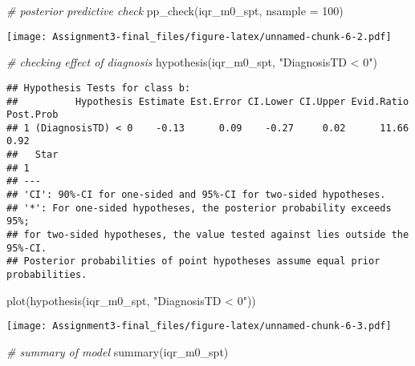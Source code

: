 \documentclass[
]{article}
\newenvironment{Shaded}{\begin{snugshade}}{\end{snugshade}}
\newcommand{\AttributeTok}[1]{\textcolor[rgb]{0.77,0.63,0.00}{#1}}
\newcommand{\CommentTok}[1]{\textcolor[rgb]{0.56,0.35,0.01}{\textit{#1}}}
\newcommand{\DecValTok}[1]{\textcolor[rgb]{0.00,0.00,0.81}{#1}}
\newcommand{\FunctionTok}[1]{\textcolor[rgb]{0.00,0.00,0.00}{#1}}
\newcommand{\NormalTok}[1]{#1}
\newcommand{\StringTok}[1]{\textcolor[rgb]{0.31,0.60,0.02}{#1}}
\begin{document}
\begin{Shaded}
\begin{Highlighting}[]
\CommentTok{\# posterior predictive check}
\FunctionTok{pp\_check}\NormalTok{(iqr\_m0\_spt, }\AttributeTok{nsample =} \DecValTok{100}\NormalTok{)}
\end{Highlighting}
\end{Shaded}

\texttt{[image: Assignment3-final\_files/figure-latex/unnamed-chunk-6-2.pdf]}

\begin{Shaded}
\begin{Highlighting}[]
\CommentTok{\# checking effect of diagnosis}
\FunctionTok{hypothesis}\NormalTok{(iqr\_m0\_spt, }\StringTok{"DiagnosisTD \textless{} 0"}\NormalTok{)}
\end{Highlighting}
\end{Shaded}

\begin{verbatim}
## Hypothesis Tests for class b:
##          Hypothesis Estimate Est.Error CI.Lower CI.Upper Evid.Ratio Post.Prob
## 1 (DiagnosisTD) < 0    -0.13      0.09    -0.27     0.02      11.66      0.92
##   Star
## 1     
## ---
## 'CI': 90%-CI for one-sided and 95%-CI for two-sided hypotheses.
## '*': For one-sided hypotheses, the posterior probability exceeds 95%;
## for two-sided hypotheses, the value tested against lies outside the 95%-CI.
## Posterior probabilities of point hypotheses assume equal prior probabilities.
\end{verbatim}

\begin{Shaded}
\begin{Highlighting}[]
\FunctionTok{plot}\NormalTok{(}\FunctionTok{hypothesis}\NormalTok{(iqr\_m0\_spt, }\StringTok{"DiagnosisTD \textless{} 0"}\NormalTok{))}
\end{Highlighting}
\end{Shaded}

\texttt{[image: Assignment3-final\_files/figure-latex/unnamed-chunk-6-3.pdf]}

\begin{Shaded}
\begin{Highlighting}[]
\CommentTok{\# summary of model}
\FunctionTok{summary}\NormalTok{(iqr\_m0\_spt)}
\end{Highlighting}
\end{Shaded}
\end{document}
